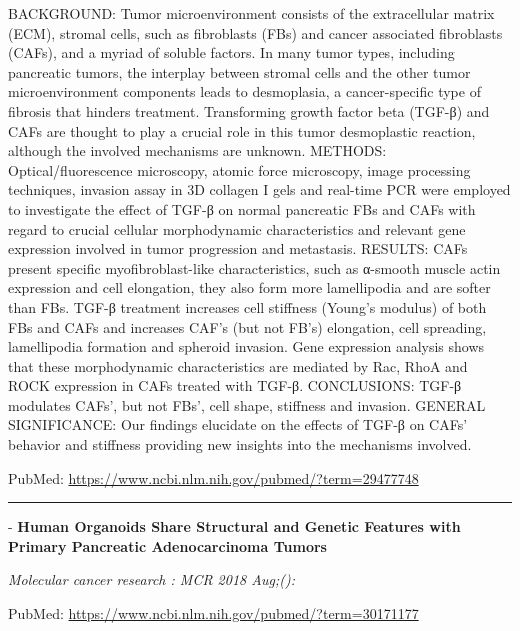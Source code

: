 \documentclass[]{article}
\begin{document}
BACKGROUND: Tumor microenvironment consists of the extracellular matrix
(ECM), stromal cells, such as fibroblasts (FBs) and cancer associated
fibroblasts (CAFs), and a myriad of soluble factors. In many tumor
types, including pancreatic tumors, the interplay between stromal cells
and the other tumor microenvironment components leads to desmoplasia, a
cancer-specific type of fibrosis that hinders treatment. Transforming
growth factor beta (TGF-β) and CAFs are thought to play a crucial role
in this tumor desmoplastic reaction, although the involved mechanisms
are unknown. METHODS: Optical/fluorescence microscopy, atomic force
microscopy, image processing techniques, invasion assay in 3D collagen I
gels and real-time PCR were employed to investigate the effect of TGF-β
on normal pancreatic FBs and CAFs with regard to crucial cellular
morphodynamic characteristics and relevant gene expression involved in
tumor progression and metastasis. RESULTS: CAFs present specific
myofibroblast-like characteristics, such as α-smooth muscle actin
expression and cell elongation, they also form more lamellipodia and are
softer than FBs. TGF-β treatment increases cell stiffness (Young's
modulus) of both FBs and CAFs and increases CAF's (but not FB's)
elongation, cell spreading, lamellipodia formation and spheroid
invasion. Gene expression analysis shows that these morphodynamic
characteristics are mediated by Rac, RhoA and ROCK expression in CAFs
treated with TGF-β. CONCLUSIONS: TGF-β modulates CAFs', but not FBs',
cell shape, stiffness and invasion. GENERAL SIGNIFICANCE: Our findings
elucidate on the effects of TGF-β on CAFs' behavior and stiffness
providing new insights into the mechanisms involved.

PubMed: \url{https://www.ncbi.nlm.nih.gov/pubmed/?term=29477748}

{}

{}

\begin{center}\rule{0.5\linewidth}{\linethickness}\end{center}

 - \textbf{Human Organoids Share Structural and Genetic Features with
Primary Pancreatic Adenocarcinoma Tumors}

\emph{Molecular cancer research : MCR 2018 Aug;():}

PubMed: \url{https://www.ncbi.nlm.nih.gov/pubmed/?term=30171177}
\end{document}
